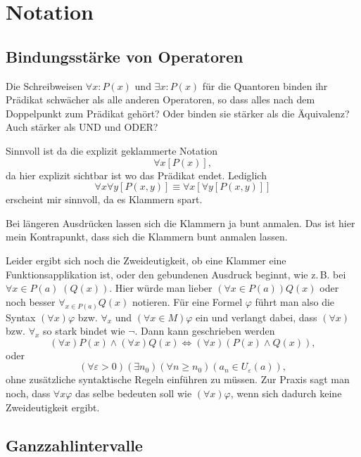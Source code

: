 \documentclass[a4paper,11pt,fleqn,twoside,BCOR=16mm]{scrartcl}
\begin{document}
\section{Notation}
\subsection{Bindungsstärke von Operatoren}
Die Schreibweisen $\forall x\colon P(x)$ und $\exists x\colon P(x)$
für die Quantoren binden ihr Prädikat schwächer als alle anderen
Operatoren, so dass alles nach dem Doppelpunkt zum Prädikat gehört?
Oder binden sie stärker als die Äquivalenz? Auch stärker als UND und
ODER?

Sinnvoll ist da die explizit geklammerte Notation
\begin{equation}
\forall x[P(x)],
\end{equation}
da hier explizit sichtbar ist wo das Prädikat endet. Lediglich
\begin{equation}
\forall x\forall y [P(x,y)] \equiv \forall x[\forall y[P(x,y)]]
\end{equation}
erscheint mir sinnvoll, da es Klammern spart.

Bei längeren Ausdrücken lassen sich die Klammern ja bunt anmalen.
Das ist hier mein Kontrapunkt, dass sich die Klammern bunt
anmalen lassen.

Leider ergibt sich noch die Zweideutigkeit, ob eine Klammer eine
Funktionsapplikation ist, oder den gebundenen Ausdruck beginnt,
wie z.\,B. bei $\forall x{\in}P(a)\;(Q(x))$. Hier würde man lieber
$(\forall x{\in}P(a))Q(x)$ oder noch besser $\forall_{x\in P(a)} Q(x)$
notieren. Für eine Formel $\varphi$
führt man also die Syntax $(\forall x)\varphi$ bzw. $\forall_x$ und
$(\forall x{\in}M)\varphi$ ein und verlangt dabei, dass $(\forall x)$
bzw. $\forall_x$ so stark bindet wie $\neg$. Dann kann geschrieben werden
\begin{equation}
(\forall x)P(x)\land (\forall x)Q(x) \iff (\forall x)(P(x)\land Q(x)),
\end{equation}
oder
\begin{equation}
(\forall\varepsilon{>}0)(\exists n_0)(\forall n{\ge}n_0)(a_n\in U_\varepsilon(a)),
\end{equation}
ohne zusätzliche syntaktische Regeln einführen zu müssen.
Zur Praxis sagt man noch, dass $\forall x\varphi$ das selbe bedeuten
soll wie $(\forall x)\varphi$, wenn sich dadurch keine Zweideutigkeit
ergibt.

\subsection{Ganzzahlintervalle}
\end{document}
